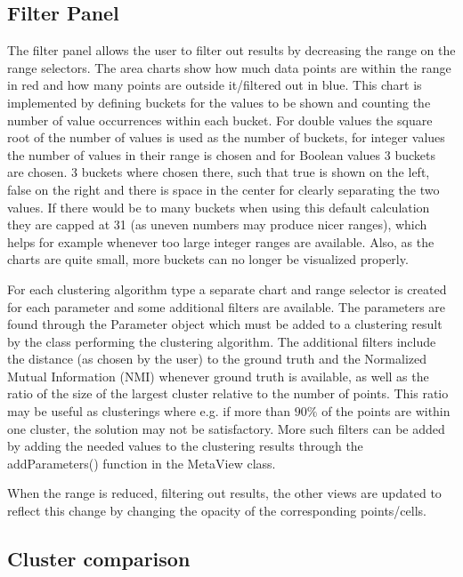\documentclass[
	a4paper,
	english,
	twoside,
	openright,               
	11pt                            
	]{report}
\begin{document}
\subsection{Filter Panel}
The filter panel allows the user to filter out results by decreasing the range on the range selectors. The area charts show how much data points are within the range in red and how many points are outside it/filtered out in blue. This chart is implemented by defining buckets for the values to be shown and counting the number of value occurrences within each bucket. For double values the square root of the number of values is used as the number of buckets, for integer values the number of values in their range is chosen and for Boolean values 3 buckets are chosen. 3 buckets where chosen there, such that true is shown on the left, false on the right and there is space in the center for clearly separating the two values. If there would be to many buckets when using this default calculation they are capped at 31 (as uneven numbers may produce nicer ranges), which helps for example whenever too large integer ranges are available. Also, as the charts are quite small, more buckets can no longer be visualized properly.

For each clustering algorithm type a separate chart and range selector is created for each parameter and some additional filters are available. The parameters are found through the Parameter object which must be added to a clustering result by the class performing the clustering algorithm. The additional filters include the distance (as chosen by the user) to the ground truth and the Normalized Mutual Information (NMI) \cite{10.5555/1756006.1953024} whenever ground truth is available, as well as the ratio of the size of the largest cluster relative to the number of points. This ratio may be useful as clusterings where e.g. if more than $90\%$ of the points are within one cluster, the solution may not be satisfactory. More such filters can be added by adding the needed values to the clustering results through the addParameters() function in the MetaView class.

When the range is reduced, filtering out results, the other views are updated to reflect this change by changing the opacity of the corresponding points/cells.

\subsection{Cluster comparison}
\end{document}
